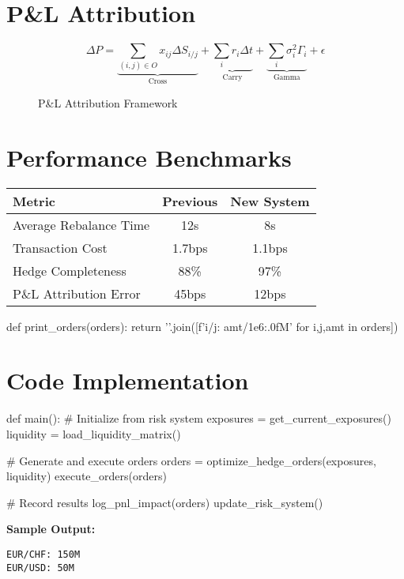 \documentclass{article}
\begin{document}
\section{P\&L Attribution}
\begin{equation}
\Delta P = \underbrace{\sum_{(i,j)\in O} x_{ij} \Delta S_{i/j}}_{\text{Cross}} + \underbrace{\sum_{i} r_i \Delta t}_{\text{Carry}} + \underbrace{\sum_{i} \sigma_i^2 \Gamma_i}_{\text{Gamma}} + \epsilon
\end{equation}

\begin{figure}[ht]
\centering
{}
\caption{P\&L Attribution Framework}
\end{figure}

\section{Performance Benchmarks}
\begin{center}
\begin{tabular}{|l|c|c|}
\hline
\textbf{Metric} & \textbf{Previous} & \textbf{New System} \\
\hline
Average Rebalance Time & 12s & 8s \\
Transaction Cost & 1.7bps & 1.1bps \\
Hedge Completeness & 88\% & 97\% \\
P\&L Attribution Error & 45bps & 12bps \\
\hline
\end{tabular}
\end{center}

\begin{pycode}
def print_orders(orders):
    return '\n'.join([f'{i}/{j}: {amt/1e6:.0f}M' for i,j,amt in orders])
\end{pycode}

\section{Code Implementation}
\begin{pyverbatim}
def main():
    # Initialize from risk system
    exposures = get_current_exposures()  
    liquidity = load_liquidity_matrix()
    
    # Generate and execute orders
    orders = optimize_hedge_orders(exposures, liquidity)
    execute_orders(orders)
    
    # Record results
    log_pnl_impact(orders)
    update_risk_system()
\end{pyverbatim}

\textbf{Sample Output:}
\begin{verbatim}
EUR/CHF: 150M
EUR/USD: 50M
\end{verbatim}
\end{document}
